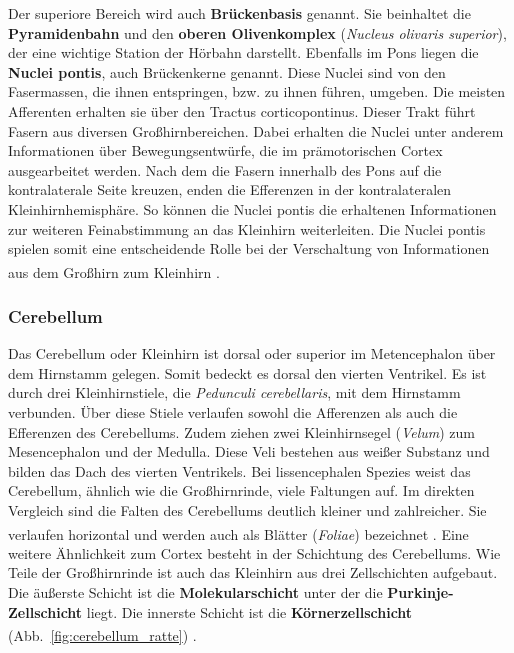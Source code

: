 \documentclass[12pt,a4paper,pdftex]{article}
\begin{document}
\noindent Der superiore Bereich wird auch \textbf{Brückenbasis} genannt. Sie beinhaltet die \textbf{Pyramidenbahn} und den \textbf{oberen Olivenkomplex} (\textit{Nucleus olivaris superior}), der eine wichtige Station der Hörbahn darstellt. Ebenfalls im Pons liegen die \textbf{Nuclei pontis}, auch Brückenkerne genannt. Diese Nuclei sind von den Fasermassen, die ihnen entspringen, bzw. zu ihnen führen, umgeben. Die meisten Afferenten erhalten sie über den Tractus corticopontinus. Dieser Trakt führt Fasern aus diversen Großhirnbereichen. Dabei erhalten die Nuclei unter anderem Informationen über Bewegungsentwürfe, die im prämotorischen Cortex ausgearbeitet werden. Nach dem die Fasern innerhalb des Pons auf die kontralaterale Seite kreuzen, enden die Efferenzen in der kontralateralen Kleinhirnhemisphäre. So können die Nuclei pontis die erhaltenen Informationen zur weiteren Feinabstimmung an das Kleinhirn weiterleiten. Die Nuclei pontis spielen somit eine entscheidende Rolle  bei der Verschaltung von Informationen aus dem Großhirn zum Kleinhirn \textsuperscript{\cite[5]{trepel2011neuroanatomie}}.

\subsubsection{Cerebellum}
\label{subsubsec:Cerebellum} 

Das Cerebellum oder Kleinhirn ist dorsal oder superior im Metencephalon über dem Hirnstamm gelegen. Somit bedeckt es dorsal den vierten Ventrikel. Es ist durch drei Kleinhirnstiele, die \textit{Pedunculi cerebellaris}, mit dem Hirnstamm verbunden. Über diese Stiele verlaufen sowohl die Afferenzen als auch die Efferenzen des Cerebellums. Zudem ziehen zwei Kleinhirnsegel (\textit{Velum}) zum Mesencephalon und der Medulla. Diese Veli bestehen aus weißer Substanz und bilden das Dach des vierten Ventrikels. Bei lissencephalen Spezies weist das Cerebellum, ähnlich wie die Großhirnrinde, viele Faltungen auf. Im direkten Vergleich sind die Falten des Cerebellums deutlich kleiner und zahlreicher. Sie verlaufen horizontal und werden auch als Blätter (\textit{Foliae}) bezeichnet \textsuperscript{\cite[7]{trepel2011neuroanatomie}}. Eine weitere Ähnlichkeit zum Cortex besteht in der Schichtung des Cerebellums. Wie Teile der  Großhirnrinde ist auch das Kleinhirn aus drei Zellschichten aufgebaut. Die äußerste Schicht ist die \textbf{Molekularschicht} unter der die \textbf{Purkinje-Zellschicht} liegt. Die innerste Schicht ist die \textbf{Körnerzellschicht} (Abb.~\ref{fig:cerebellum_ratte}) \textsuperscript{\cite[14]{penzlin2005tierphys}}.
\end{document}
